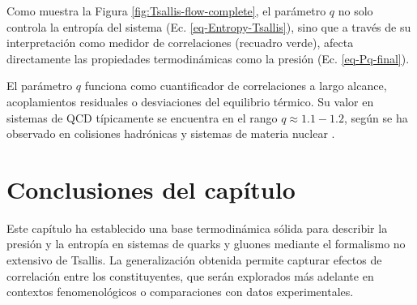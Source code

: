 Como muestra la Figura \ref{fig:Tsallis-flow-complete}, el parámetro $q$ no solo controla la entropía del sistema (Ec. \ref{eq-Entropy-Tsallis}), sino que a través de su interpretación como medidor de correlaciones (recuadro verde), afecta directamente las propiedades termodinámicas como la presión (Ec. \ref{eq-Pq-final}).

\begin{remark}
El parámetro \( q \) funciona como cuantificador de correlaciones a largo alcance, acoplamientos residuales o desviaciones del equilibrio térmico. Su valor en sistemas de QCD típicamente se encuentra en el rango \( q \approx 1.1 - 1.2 \), según se ha observado en colisiones hadrónicas y sistemas de materia nuclear \cite{Bhattacharyya_2018, Tsallis_2014}.
\end{remark}


\section*{Conclusiones del capítulo}
Este capítulo ha establecido una base termodinámica sólida para describir la presión y la entropía en sistemas de quarks y gluones mediante el formalismo no extensivo de Tsallis. La generalización obtenida permite capturar efectos de correlación entre los constituyentes, que serán explorados más adelante en contextos fenomenológicos o comparaciones con datos experimentales.

\blankpage